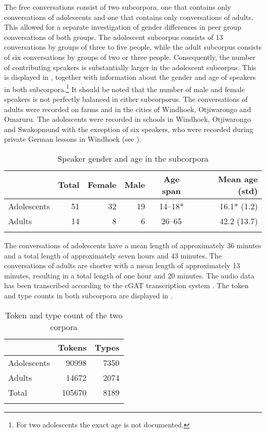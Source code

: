 \documentclass[output=paper]{langsci/langscibook}
\begin{document}
The free conversations consist of two subcorpora, one that contains only conversations of adolescents and one that contains only conversations of adults. This allowed for a separate investigation of gender differences in peer group conversations of both groups. The adolescent subcorpus consists of 13 conversations by groups of three to five people, while the adult subcorpus consists of six conversations by groups of two or three people. Consequently, the number of contributing speakers is substantially larger in the adolescent subcorpus. This is displayed in , together with information about the gender and age of speakers in both subcorpora.\footnote{For two adolescents the exact age is not documented.} It should be noted that the number of male and female speakers is not perfectly balanced in either subcorporus. The conversations of adults were recorded on farms and in the cities of Windhoek, Otjiwarongo and Omaruru. The adolescents were recorded in schools in Windhoek, Otjiwarongo and Swakopmund with the exception of six speakers, who were recorded during private German lessons in Windhoek (see ).

  
\begin{table}
\begin{tabular}{l rrr cr} 
\lsptoprule
& {Total} & {Female} & {Male} & {Age span} & {Mean age (std)}\\
\midrule
Adolescents & 51 & 32 & 19 & 14--18* & 16.1* (1.2)\\
Adults & 14 & 8 & 6 & 26--65 & 42.2 (13.7)\\
\lspbottomrule
\end{tabular}
\caption{Speaker gender and age in the subcorpora \label{tab:bracke:1}}
\end{table}  

The conversations of adolescents have a mean length of approximately 36 minutes and a total length of approximately seven hours and 43 minutes. The conversations of adults are shorter with a mean length of approximately 13 minutes, resulting in a total length of one hour and 20 minutes. The audio data has been transcribed according to the cGAT transcription system \citep{schmidt_cgat_2015}. The token and type counts in both subcorpora are displayed in .

\begin{table}
\begin{tabular}{lrr} 
\lsptoprule
& {Tokens} & {Types}\\
\midrule
{Adolescents} & {90998} & {7350}\\
{Adults} & {14672} & {2074}\\
{Total} & {105670} & {8189}\\
\lspbottomrule
\end{tabular}
\caption{Token and type count of the two corpora\label{tab:bracke:2}}
\end{table}  
\end{document}
